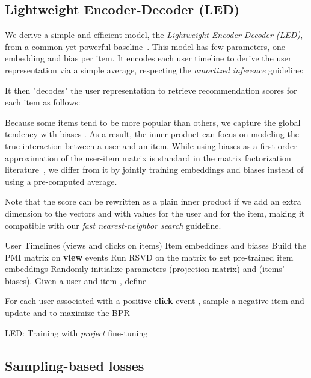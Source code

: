 \documentclass[sigconf]{acmart}
\begin{document}
\subsection{Lightweight Encoder-Decoder (LED)}
\label{subsec:LED}

We derive a simple and efficient model, the \emph{Lightweight Encoder-Decoder (LED)}, from a common yet powerful baseline~\cite{starspace-facebook}. This model has few parameters, one embedding  and bias  per item. It encodes each user timeline  to derive the user representation  via a simple average, respecting the \emph{amortized inference} guideline:

It then "decodes" the user representation to retrieve recommendation scores for each item  as follows:


Because some items tend to be more popular than others, we capture the global tendency with biases . As a result, the inner product can focus on modeling the true interaction between a user and an item. While using biases as a first-order approximation of the user-item matrix is standard in the matrix factorization literature~\cite{koren,paterek}, we differ from it by jointly training embeddings and biases instead of using a pre-computed average.

Note that the score can be rewritten as a plain inner product if we add an extra dimension to the vectors  and  with values  for the user and  for the item, making it compatible with our \emph{fast nearest-neighbor search} guideline.

\begin{algorithm}[tb]
  \begin{algorithmic}[1]
    \Input User Timelines (views and clicks on items)
    \Output Item embeddings  and biases 
    \State Build the PMI matrix  on \textbf{view} events
    \State Run RSVD on the  matrix to get pre-trained item embeddings 
    \State Randomly initialize parameters  (projection matrix) and  (items' biases). Given a user  and item , define
    
\State For each user  associated with a positive \textbf{click} event , sample a negative item  and update  and  to maximize the BPR
        
    
\end{algorithmic}
 \caption{LED: Training with \emph{project} fine-tuning}
 \label{alg:led-training-procedure}
\end{algorithm}

\subsection{Sampling-based losses}
\label{subsec:training}
\end{document}

